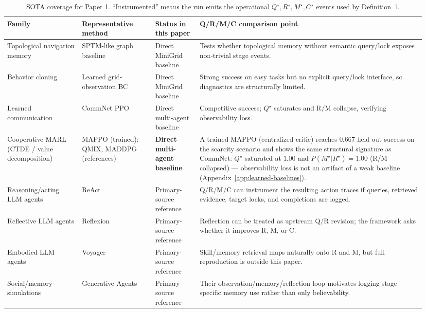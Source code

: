 \documentclass{article}
\begin{document}
\begin{table}[h]
\caption{SOTA coverage for Paper 1. ``Instrumented'' means the run emits the operational $Q^\star,R^\star,M^\star,C^\star$ events used by Definition~1.}
\label{tab:sota-coverage}
\centering
\small
\begin{tabular}{p{2.45cm}p{2.55cm}p{2.7cm}p{4.0cm}}
\toprule
Family & Representative method & Status in this paper & Q/R/M/C comparison point \\
\midrule
Topological navigation memory & SPTM-like graph baseline \citep{savinov2018semi} & Direct MiniGrid baseline & Tests whether topological memory without semantic query/lock exposes non-trivial stage events. \\
Behavior cloning & Learned grid-observation BC & Direct MiniGrid baseline & Strong success on easy tasks but no explicit query/lock interface, so diagnostics are structurally limited. \\
Learned communication & CommNet PPO \citep{sukhbaatar2016commnet,schulman2017proximal} & Direct multi-agent baseline & Competitive success; $Q^\star$ saturates and R/M collapse, verifying observability loss. \\
Cooperative MARL (CTDE / value decomposition) & MAPPO \citep{yu2022mappo} (trained); QMIX, MADDPG \citep{rashid2018qmix,lowe2017maddpg} (references) & \textbf{Direct multi-agent baseline} & A trained MAPPO (centralized critic) reaches $0.667$ held-out success on the scarcity scenario and shows the same structural signature as CommNet: $Q^\star$ saturated at $1.00$ and $P(M^\star|R^\star){=}1.00$ (R/M collapsed) --- observability loss is not an artifact of a weak baseline (Appendix~\ref{app:learned-baselines}). \\
Reasoning/acting LLM agents & ReAct \citep{yao2022react} & Primary-source reference & Q/R/M/C can instrument the resulting action traces if queries, retrieved evidence, target locks, and completions are logged. \\
Reflective LLM agents & Reflexion \citep{shinn2023reflexion} & Primary-source reference & Reflection can be treated as upstream Q/R revision; the framework asks whether it improves R, M, or C. \\
Embodied LLM agents & Voyager \citep{wang2023voyager} & Primary-source reference & Skill/memory retrieval maps naturally onto R and M, but full reproduction is outside this paper. \\
Social/memory simulations & Generative Agents \citep{park2023generative} & Primary-source reference & Their observation/memory/reflection loop motivates logging stage-specific memory use rather than only believability. \\

\end{tabular}
\end{table}
\end{document}
